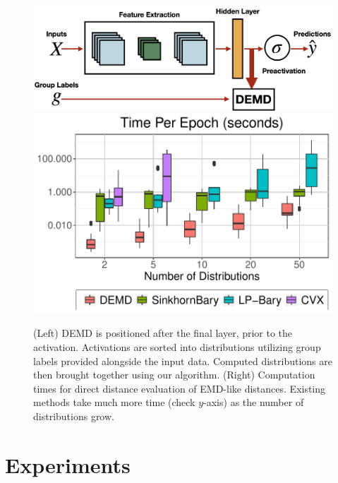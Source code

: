 \begin{figure}[t]
\vspace{-0.1in}
    \centering
    \raisebox{\baselineskip}%
    {\includegraphics[width=0.55\columnwidth]{6_demd/figs/net_diff_new.png}%
    }%
    \;
    \includegraphics[width=0.35\columnwidth]{6_demd/figs/Distance_Comparisons.pdf}
    \vspace{-10pt}
    \caption{\footnotesize \label{fig:dists} (Left) DEMD is positioned after the final layer, prior to the activation. Activations are sorted into distributions utilizing group labels provided alongside the input data. Computed distributions are then brought together using our algorithm. (Right) Computation times for direct distance evaluation of EMD-like distances. Existing methods take much more time {\color{blue}(check $y$-axis)} as the number of distributions grow.}
    \vspace{-5pt}
\end{figure}

\section{Experiments}
\label{sec:results}
\vspace{-5pt}



